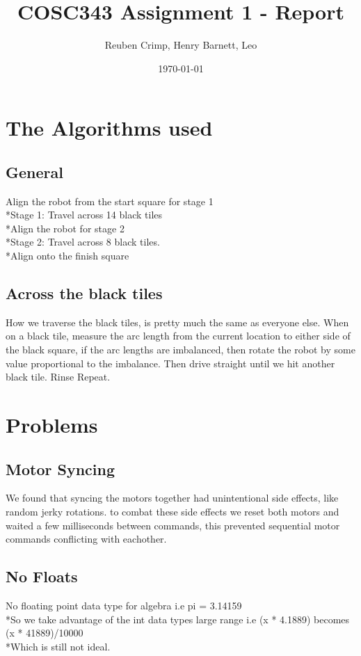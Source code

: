 \documentclass[a4paper,11pt]{article}
\title{COSC343 Assignment 1 - Report}
\author{Reuben Crimp, Henry Barnett, Leo}
\date{\today}
\begin{document}
\maketitle
\section {The Algorithms used}

\subsection{General}
Align the robot from the start square for stage 1
\\*Stage 1: Travel across 14 black tiles
\\*Align the robot for stage 2
\\*Stage 2: Travel across 8 black tiles.
\\*Align onto the finish square

\subsection{Across the black tiles}
How we traverse the black tiles, is pretty much the same as everyone else.
When on a black tile, measure the arc length from the current location to either side of the black square, if the arc lengths are imbalanced, then rotate the robot by some value proportional to the imbalance.
Then drive straight until we hit another black tile. Rinse Repeat.

\section {Problems}

\subsection{Motor Syncing}
We found that syncing the motors together had unintentional side effects, like random jerky rotations. to combat these side effects we reset both motors and waited a few milliseconds between commands, this prevented sequential motor commands conflicting with eachother.

\subsection{No Floats}
No floating point data type for algebra i.e pi = 3.14159
\\*So we take advantage of the int data types large range
i.e (x * 4.1889) becomes (x * 41889)/10000
\\*Which is still not ideal.
\end{document}

